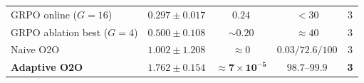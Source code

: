 \begin{table}[h]
\begin{tabular}{lcccc}
GRPO online ($G{=}16$)        & $0.297 \pm 0.017$          & $0.24$                                & $<30$                        & 3             \\
GRPO ablation best ($G{=}4$)  & $0.500 \pm 0.108$          & $\sim 0.20$                           & $\approx 40$                 & 3             \\
\midrule
Naive O2O                     & $1.002 \pm 1.208$          & $\approx 0$                           & $0.03/72.6/100$              & 3             \\
\textbf{Adaptive O2O}         & $\mathbf{1.762 \pm 0.154}$ & $\mathbf{\approx 7\!\times\!10^{-5}}$ & $\mathbf{98.7\text{--}99.9}$ & \textbf{3}    \\
\bottomrule
\end{tabular}
\end{table}

